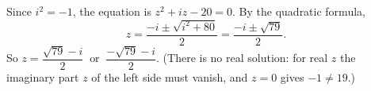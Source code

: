 Since $i^2=-1$, the equation is $z^2+iz-20=0$. By the quadratic formula,
\[z=\dfrac{-i\pm\sqrt{i^2+80}}{2}=\dfrac{-i\pm\sqrt{79}}{2}.\]
So $z=\boxed{\dfrac{\sqrt{79}-i}{2}\ \text{ or }\ \dfrac{-\sqrt{79}-i}{2}}$. (There is no real solution: for real $z$ the imaginary part $z$ of the left side must vanish, and $z=0$ gives $-1\ne19$.)

